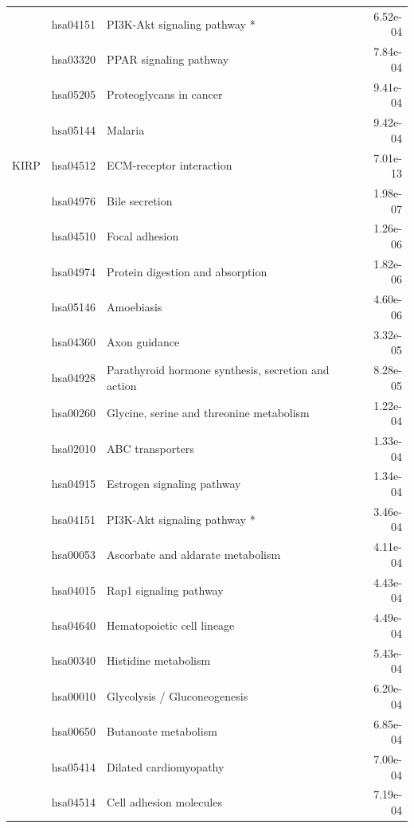 \begin{longtable}{cllr}
 & hsa04151 & \textcolor{\clrnew}{PI3K-Akt signaling pathway *} & 6.52e-04 \\ 
 & hsa03320 & \textcolor{\clrnew}{PPAR signaling pathway} & 7.84e-04 \\ 
 & hsa05205 & \textcolor{\clrnew}{Proteoglycans in cancer} & 9.41e-04 \\ 
 & hsa05144 & \textcolor{\clrnew}{Malaria} & 9.42e-04 \\ 
\midrule 
\rowcolor{\clrmatch}KIRP & hsa04512 & ECM-receptor interaction & 7.01e-13\\ 
 & hsa04976 & \textcolor{\clrnew}{Bile secretion} & 1.98e-07 \\ 
 \rowcolor{\clrmatch}& hsa04510 & Focal adhesion & 1.26e-06 \\ 
 \rowcolor{\clrmatch}& hsa04974 & Protein digestion and absorption & 1.82e-06 \\ 
 & hsa05146 & \textcolor{\clrnew}{Amoebiasis} & 4.60e-06 \\ 
 & hsa04360 & \textcolor{\clrnew}{Axon guidance} & 3.32e-05 \\ 
 & hsa04928 & \textcolor{\clrnew}{Parathyroid hormone synthesis, secretion and action} & 8.28e-05 \\ 
 & hsa00260 & \textcolor{\clrnew}{Glycine, serine and threonine metabolism} & 1.22e-04 \\ 
 & hsa02010 & \textcolor{\clrnew}{ABC transporters} & 1.33e-04 \\ 
 & hsa04915 & \textcolor{\clrnew}{Estrogen signaling pathway} & 1.34e-04 \\ 
 & hsa04151 & \textcolor{\clrnew}{PI3K-Akt signaling pathway *} & 3.46e-04 \\ 
 & hsa00053 & \textcolor{\clrnew}{Ascorbate and aldarate metabolism} & 4.11e-04 \\ 
 & hsa04015 & \textcolor{\clrnew}{Rap1 signaling pathway} & 4.43e-04 \\ 
 & hsa04640 & \textcolor{\clrnew}{Hematopoietic cell lineage} & 4.49e-04 \\ 
 & hsa00340 & \textcolor{\clrnew}{Histidine metabolism} & 5.43e-04 \\ 
 & hsa00010 & \textcolor{\clrnew}{Glycolysis / Gluconeogenesis} & 6.20e-04 \\ 
 & hsa00650 & \textcolor{\clrnew}{Butanoate metabolism} & 6.85e-04 \\ 
 & hsa05414 & \textcolor{\clrnew}{Dilated cardiomyopathy} & 7.00e-04 \\ 
 & hsa04514 & \textcolor{\clrnew}{Cell adhesion molecules} & 7.19e-04 \\ 

\end{longtable}
